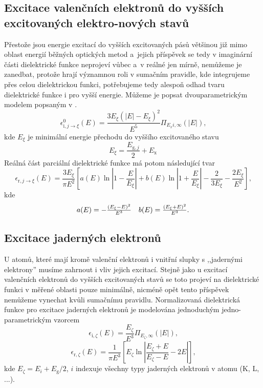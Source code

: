 \subsection{Excitace valenčních elektronů do vyšších excitovaných elektro-nových stavů}
Přestože jsou energie excitací do vyšších excitovaných pásů většinou již mimo oblast energií běžných optických metod a~jejich příspěvek se tedy v imaginární části dielektrické funkce neprojeví vůbec a~v reálné jen mírně, nemůžeme je zanedbat, protože hrají významnou roli v sumačním pravidle, kde integrujeme přes celou dielektrickou funkci, potřebujeme tedy alespoň odhad tvaru dielektrické funkce i pro vyšší energie. 
Můžeme je popsat dvouparametrickým modelem popsaným v \cite{sumrule}.
\begin{equation}
\label{vyssiexcitace}
\epsilon_{\mathrm{i}, j \rightarrow \xi}^0(E) = \frac{3 E_\xi(|E| - E_\xi)^2}{E^5} \Pi_{E_xi, \infty}(|E|) \text{,}
\end{equation}
kde $E_\xi$ je minimální energie přechodu do vyššího excitovaného stavu
\begin{equation}
E_\xi = \frac{E_{\mathrm{g},j}}{2} + E_\mathrm{x}
\end{equation}
Reálná část parciální dielektrické funkce má potom následující tvar
\begin{equation}
\epsilon_{\mathrm{r}, j \rightarrow \xi}(E) = 
\frac{3E_\xi}{\pi E^2}
\left[
	a(E) \ln\left|1-\frac{E}{E_\xi}\right|
	+ b(E) \ln\left|1 + \frac{E}{E_\xi}\right|
	- \frac{2}{3E_\xi} - \frac{2E_\xi}{E^2}
\right] \text{,}
\end{equation}
kde
\begin{equation}
\begin{array}{c c}
a(E) = -\frac{(E_\xi - E)^2}{E^3} &
b(E) = \frac{(E_\xi + E)^2}{E^3} \text{.}\\
\end{array}
\end{equation}


\subsection{Excitace jaderných elektronů}
U atomů, které mají kromě valenční elektronů i vnitřní slupky s ,,jadernými elektrony'' musíme zahrnout i vliv jejich excitací. Stejně jako u excitací valenčních elektronů do vyšších excitovaných stavů se toto projeví na dielektrické funkci v měřené oblasti pouze minimálně, nicméně opět tento příspěvek nemůžeme vynechat kvůli sumačnímu pravidlu. Normalizovaná dielektrická funkce pro excitace jaderných elektronů je modelována jednoduchým jedno-parametrickým vzorcem \cite{sumrule2}
\begin{equation}
\label{jaderneel}
\epsilon_{\mathrm{i},\zeta}(E) = \frac{E_\zeta}{E^3} \Pi_{E_\zeta,\infty}(|E|) \text{,}
\end{equation}
\begin{equation}
\epsilon_{\mathrm{r},\zeta}(E) = \frac{1}{\pi E^3}\left[ E_\zeta \ln\left| \frac{E_\zeta + E}{E_\zeta - E} - 2E\right| \right] \text{,}
\end{equation}
kde $E_\zeta = E_i + E_\mathrm{g}/2$, $i$ indexuje všechny typy jaderných elektronů v atomu (K, L, ...). 

